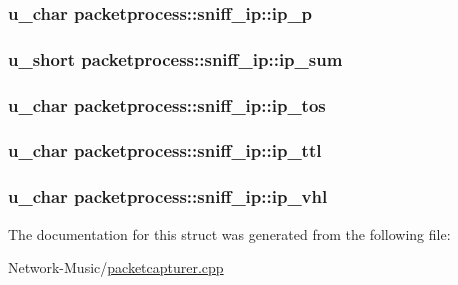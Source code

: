 \hypertarget{structpacketprocess_1_1sniff__ip_a98e71ce9ec87082492b4bf2622903ae3}{
\subsubsection[{ip\-\_\-p}]{\setlength{\rightskip}{0pt plus 5cm}u\-\_\-char packetprocess\-::sniff\-\_\-ip\-::ip\-\_\-p}}\label{structpacketprocess_1_1sniff__ip_a98e71ce9ec87082492b4bf2622903ae3}
\hypertarget{structpacketprocess_1_1sniff__ip_a596850a71ac22e40f393d5ea7d456b1e}{
\subsubsection[{ip\-\_\-sum}]{\setlength{\rightskip}{0pt plus 5cm}u\-\_\-short packetprocess\-::sniff\-\_\-ip\-::ip\-\_\-sum}}\label{structpacketprocess_1_1sniff__ip_a596850a71ac22e40f393d5ea7d456b1e}
\hypertarget{structpacketprocess_1_1sniff__ip_a106bc8a251b55cdd13934bfed4785ae6}{
\subsubsection[{ip\-\_\-tos}]{\setlength{\rightskip}{0pt plus 5cm}u\-\_\-char packetprocess\-::sniff\-\_\-ip\-::ip\-\_\-tos}}\label{structpacketprocess_1_1sniff__ip_a106bc8a251b55cdd13934bfed4785ae6}
\hypertarget{structpacketprocess_1_1sniff__ip_adcc8fd2d0bc337b78d7956e150bd5d89}{
\subsubsection[{ip\-\_\-ttl}]{\setlength{\rightskip}{0pt plus 5cm}u\-\_\-char packetprocess\-::sniff\-\_\-ip\-::ip\-\_\-ttl}}\label{structpacketprocess_1_1sniff__ip_adcc8fd2d0bc337b78d7956e150bd5d89}
\hypertarget{structpacketprocess_1_1sniff__ip_a58f9c8e74a6204cd38bb6e404c2338c5}{
\subsubsection[{ip\-\_\-vhl}]{\setlength{\rightskip}{0pt plus 5cm}u\-\_\-char packetprocess\-::sniff\-\_\-ip\-::ip\-\_\-vhl}}\label{structpacketprocess_1_1sniff__ip_a58f9c8e74a6204cd38bb6e404c2338c5}


The documentation for this struct was generated from the following file\-:\begin{DoxyCompactItemize}
\item 
Network-\/\-Music/\hyperlink{packetcapturer_8cpp}{packetcapturer.\-cpp}\end{DoxyCompactItemize}
